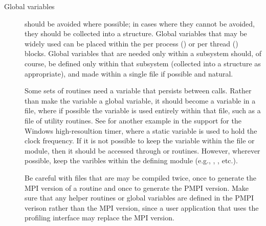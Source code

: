 \documentclass{article}
\begin{document}
\begin{description}



\item[Global variables]should be avoided where possible; in cases
where they cannot be avoided, they should be collected into a
structure.  Global variables that may be widely used can be placed
within the per process () or per thread
() blocks.  Global variables that are needed only
within a subsystem should, of course, be defined only within that
subsystem (collected into a structure as appropriate), and made
 within a single file if possible and natural.

Some sets of routines need a variable that persists between calls.
Rather than make the variable a global variable, it should become a
 variable in a file, where if possible the variable is used
entirely within that file, such as a file of utility routines.  See
 for another example in the support for the Windows
high-resoultion timer, where a static variable is used to hold the
clock frequency.  If it is not possible to keep the variable within
the file or module, then it should be accessed through  or
routines.  However, wherever possible, keep the varibles within the
defining module (e.g., , , etc.).

Be careful with files that are may be compiled twice, once to generate
the MPI version of a routine and once to generate the PMPI version.
Make sure that any helper routines or global variables are defined in
the PMPI verison rather than the MPI version, since a user application
that uses the profiling interface may replace the MPI version.


\end{description}
\end{document}
